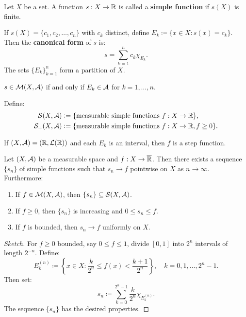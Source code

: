 \begin{definition}
Let $X$ be a set. A function $s:X \to \mathbb{R}$ is called a \textbf{simple function} if $s(X)$ is finite.
\end{definition}

If $s(X) = \{c_1, c_2, \dots, c_n\}$ with $c_k$ distinct, define $E_k \coloneqq \{ x \in X : s(x) = c_k \}$.
Then the \textbf{canonical form} of $s$ is:
\[
s = \sum_{k=1}^{n} c_k \chi_{E_k}.
\]
The sets $\{E_k\}_{k=1}^n$ form a partition of $X$.

\begin{remark}
$s \in \mathcal{M}(X,\mathcal{A})$ if and only if $E_k \in \mathcal{A}$ for $k = 1,\dots,n$.
\end{remark}

Define:
\begin{align*}
\mathcal{S}(X,\mathcal{A}) &\mathrel{\mathop:}= \{ \text{measurable simple functions } f:X \to \mathbb{R} \}, \\
\mathcal{S}_+(X,\mathcal{A}) &\mathrel{\mathop:}= \{ \text{measurable simple functions } f:X \to \mathbb{R}, f \geq 0 \}.
\end{align*}

\begin{remark}
If $(X,\mathcal{A}) = (\mathbb{R}, \mathcal{L}(\mathbb{R}))$ and each $E_k$ is an interval, then $f$ is a step function.
\end{remark}

\clearpage
\begin{theorem}
Let $(X,\mathcal{A})$ be a measurable space and $f:X \to \overline{\mathbb{R}}$.
Then there exists a sequence $\{s_n\}$ of simple functions such that $s_n \to f$ pointwise on $X$ as $n \to \infty$.
Furthermore:
\begin{enumerate}
    \item If $f \in \mathcal{M}(X,\mathcal{A})$, then $\{s_n\} \subseteq \mathcal{S}(X,\mathcal{A})$.
    \item If $f \geq 0$, then $\{s_n\}$ is increasing and $0 \leq s_n \leq f$.
    \item If $f$ is bounded, then $s_n \to f$ uniformly on $X$.
\end{enumerate}
\end{theorem}

\begin{proof} [Sketch]
For $f \geq 0$ bounded, say $0 \leq f \leq 1$, divide $[0,1]$ into $2^n$ intervals of length $2^{-n}$.
Define:
\[
E_k^{(n)} \coloneqq \left\{ x \in X : \frac{k}{2^n} \leq f(x) < \frac{k+1}{2^n} \right\}, \quad k = 0,1,\dots,2^n-1.
\]
Then set:
\[
s_n \coloneqq \sum_{k=0}^{2^n-1} \frac{k}{2^n} \chi_{E_k^{(n)}}.
\]
The sequence $\{s_n\}$ has the desired properties.
\end{proof}

